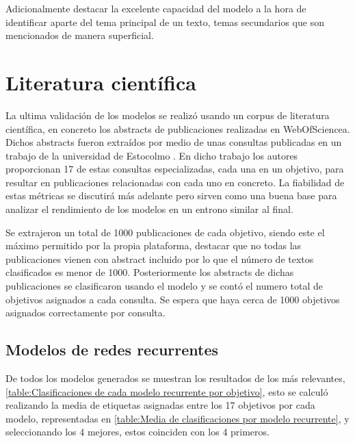 Adicionalmente destacar la excelente capacidad del modelo a la hora de
identificar aparte del tema principal de un texto, temas secundarios que son
mencionados de manera superficial. 

\section{Literatura científica}

La ultima validación de los modelos se realizó usando un corpus de literatura
científica, en concreto los abstracts de publicaciones realizadas en
\gls{WebOfSciencea}. Dichos abstracts fueron extraídos por medio de unas
consultas publicadas en un trabajo de la universidad de Estocolmo \cite{SDGQueries}. En
dicho trabajo los autores proporcionan 17 de estas consultas especializadas,
cada una en un objetivo, para resultar en publicaciones relacionadas con cada
uno en concreto. La fiabilidad de estas métricas se discutirá más adelante pero
sirven como una buena base para analizar el rendimiento de los modelos en un
entrono similar al final.

Se extrajeron un total de 1000 publicaciones de cada objetivo, siendo este el
máximo permitido por la propia plataforma, destacar que no todas las
publicaciones vienen con abstract incluido por lo que el número de textos
clasificados es menor de 1000. Posteriormente los abstracts de dichas
publicaciones se clasificaron usando el modelo y se contó el numero total de
objetivos asignados a cada consulta. Se espera que haya cerca de 1000 objetivos
asignados correctamente por consulta.

\subsection{Modelos de redes recurrentes}
De todos los modelos generados se muestran los resultados de los más relevantes,
\cref{table:Clasificaciones de cada modelo recurrente por objetivo}, esto se
calculó realizando la media de etiquetas asignadas entre los 17 objetivos por
cada modelo, representadas en \cref{table:Media de clasificaciones por modelo
recurrente}, y seleccionando los 4 mejores, estos coinciden con los 4 primeros.

